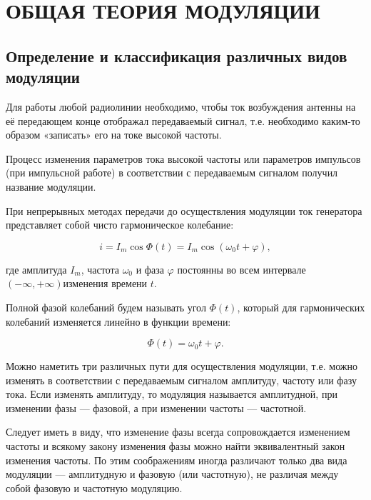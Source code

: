 
\usepackage{gensymb}
\usepackage{textcomp}
\usepackage{pythontex}


\def\labauthors{Карусевич А.А, Понур К.А.}
\def\labgroup{430}
\def\department{Кафедра радиоэлектроники}
\def\labnumber{1}
\def\labtheme{Исследование амплитудной модуляции}

\renewcommand{\Re}{\operatorname{Re}}
\renewcommand{\Im}{\operatorname{Im}}
\renewcommand{\phi}{\varphi}
\renewcommand{\hat}{\widehat}




\section{ОБЩАЯ ТЕОРИЯ МОДУЛЯЦИИ}
\subsection{Определение и классификация различных видов модуляции}

Для работы любой радиолинии необходимо, чтобы ток возбуждения антенны на её передающем конце отображал передаваемый сигнал, т.е. необходимо каким-то образом «записать» его на токе высокой частоты.

Процесс изменения параметров тока высокой частоты или параметров импульсов (при импульсной работе) в соответствии с передаваемым сигналом получил название модуляции.

При непрерывных методах передачи до осуществления модуляции ток генератора представляет собой чисто гармоническое колебание:

$$i = I_m\cos{\Phi(t)} = I_m\cos{(\omega_0 t + \varphi)},$$

где амплитуда $I_m$, частота $\omega_0$ и фаза $\varphi$ постоянны во всем интервале $(-\infty, +\infty)$изменения времени $t$.

Полной фазой колебаний будем называть угол $\Phi(t)$, который для гармонических колебаний изменяется линейно в функции времени:

$$\Phi(t) = \omega_0 t + \varphi.$$

Можно наметить три различных пути для осуществления модуляции, т.е. можно изменять в соответствии с передаваемым сигналом амплитуду, частоту или фазу тока. Если изменять амплитуду, то модуляция называется амплитудной, при изменении фазы — фазовой, а при изменении частоты — частотной.

Следует иметь в виду, что изменение фазы всегда сопровождается изменением частоты и всякому закону изменения фазы можно найти эквивалентный закон изменения частоты. По этим соображениям иногда различают только два вида модуляции — амплитудную и фазовую (или частотную), не различая между собой фазовую и частотную модуляцию.

